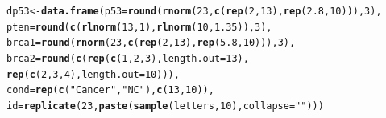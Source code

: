 \documentclass{config/apuntes}\usepackage[]{graphicx}\usepackage[]{xcolor}
\makeatletter
\newcommand{\hlnum}[1]{\textcolor[rgb]{0.686,0.059,0.569}{#1}}%
\newcommand{\hlsng}[1]{\textcolor[rgb]{0.192,0.494,0.8}{#1}}%
\newcommand{\hldef}[1]{\textcolor[rgb]{0.345,0.345,0.345}{#1}}%
\newcommand{\hlkwb}[1]{\textcolor[rgb]{0.69,0.353,0.396}{#1}}%
\newcommand{\hlkwc}[1]{\textcolor[rgb]{0.333,0.667,0.333}{#1}}%
\newcommand{\hlkwd}[1]{\textcolor[rgb]{0.737,0.353,0.396}{\textbf{#1}}}%
\newenvironment{kframe}{%
 \def\at@end@of@kframe{}%
 \ifinner\ifhmode%
  \def\at@end@of@kframe{\end{minipage}}%
  \begin{minipage}{\columnwidth}%
 \fi\fi%
 \def\FrameCommand##1{\hskip\@totalleftmargin \hskip-\fboxsep
 \colorbox{shadecolor}{##1}\hskip-\fboxsep
     \hskip-\linewidth \hskip-\@totalleftmargin \hskip\columnwidth}%
 \MakeFramed {\advance\hsize-\width
   \@totalleftmargin\z@ \linewidth\hsize
   \@setminipage}}%
 {\par\unskip\endMakeFramed%
 \at@end@of@kframe}
\newenvironment{knitrout}{}{} %
\makeatother
\begin{document}
\begin{knitrout}
\color{fgcolor}\begin{kframe}
\begin{alltt}
\hldef{dp53} \hlkwb{<-} \hlkwd{data.frame}\hldef{(}\hlkwc{p53} \hldef{=} \hlkwd{round}\hldef{(}\hlkwd{rnorm}\hldef{(}\hlnum{23}\hldef{,} \hlkwd{c}\hldef{(}\hlkwd{rep}\hldef{(}\hlnum{2}\hldef{,} \hlnum{13}\hldef{),} \hlkwd{rep}\hldef{(}\hlnum{2.8}\hldef{,} \hlnum{10}\hldef{))),} \hlnum{3}\hldef{),}
                   \hlkwc{pten} \hldef{=} \hlkwd{round}\hldef{(}\hlkwd{c}\hldef{(}\hlkwd{rlnorm}\hldef{(}\hlnum{13}\hldef{,} \hlnum{1}\hldef{),} \hlkwd{rlnorm}\hldef{(}\hlnum{10}\hldef{,} \hlnum{1.35}\hldef{)),} \hlnum{3}\hldef{),}
                   \hlkwc{brca1} \hldef{=} \hlkwd{round}\hldef{(}\hlkwd{rnorm}\hldef{(}\hlnum{23}\hldef{,} \hlkwd{c}\hldef{(}\hlkwd{rep}\hldef{(}\hlnum{2}\hldef{,} \hlnum{13}\hldef{),} \hlkwd{rep}\hldef{(}\hlnum{5.8}\hldef{,} \hlnum{10}\hldef{))),} \hlnum{3}\hldef{),}
                   \hlkwc{brca2} \hldef{=} \hlkwd{round}\hldef{(}\hlkwd{c}\hldef{(}\hlkwd{rep}\hldef{(}\hlkwd{c}\hldef{(}\hlnum{1}\hldef{,} \hlnum{2}\hldef{,} \hlnum{3}\hldef{),} \hlkwc{length.out} \hldef{=} \hlnum{13}\hldef{),}
                       \hlkwd{rep}\hldef{(}\hlkwd{c}\hldef{(}\hlnum{2}\hldef{,} \hlnum{3}\hldef{,} \hlnum{4}\hldef{),} \hlkwc{length.out} \hldef{=} \hlnum{10}\hldef{))),}
                   \hlkwc{cond} \hldef{=} \hlkwd{rep}\hldef{(}\hlkwd{c}\hldef{(}\hlsng{"Cancer"}\hldef{,} \hlsng{"NC"}\hldef{),} \hlkwd{c}\hldef{(}\hlnum{13}\hldef{,} \hlnum{10}\hldef{)),}
                   \hlkwc{id} \hldef{=} \hlkwd{replicate}\hldef{(}\hlnum{23}\hldef{,} \hlkwd{paste}\hldef{(}\hlkwd{sample}\hldef{(letters,} \hlnum{10}\hldef{),} \hlkwc{collapse} \hldef{=} \hlsng{""}\hldef{)))}
\end{alltt}
\end{kframe}
\end{knitrout}
\end{document}
